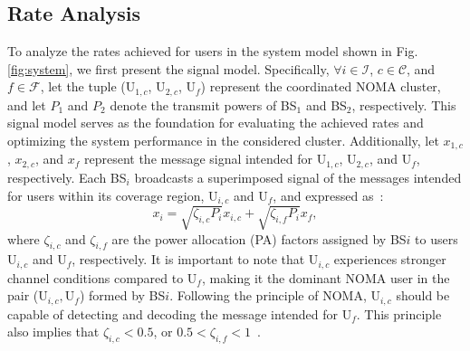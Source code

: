 \documentclass[conference]{IEEEtran}
\begin{document}
\subsection{Rate Analysis}
To analyze the rates achieved for users in the system model shown in Fig. \ref{fig:system}, we first present the signal model. Specifically, $\forall i \in \mathcal{I}$, $c \in \mathcal{C}$, and $f \in \mathcal{F}$, let the tuple (U$_{1,c}$, U$_{2,c}$, U$_f$) represent the coordinated NOMA cluster, and let $P_1$ and $P_2$ denote the transmit powers of BS$_1$ and BS$_2$, respectively. This signal model serves as the foundation for evaluating the achieved rates and optimizing the system performance in the considered cluster. Additionally, let $x_{1,c}$, $x_{2,c}$, and $x_f$ represent the message signal intended for U$_{1,c}$, U$_{2,c}$, and U$_f$, respectively. Each BS$_i$ broadcasts a superimposed signal of the messages intended for users within its coverage region, U$_{i,c}$ and U$_f$, and expressed as~\cite{saito2013non}:
\begin{equation}
    x_{i}=\sqrt{\zeta_{i,c}P_i}x_{i,c} + \sqrt{\zeta_{i,f}P_i}x_f,
\end{equation}
where $\zeta_{i,c}$ and $\zeta_{i,f}$ are the power allocation (PA) factors assigned by BS$i$ to users U$_{i,c}$ and U$_f$, respectively. It is important to note that U$_{i,c}$ experiences stronger channel conditions compared to U$_f$, making it the dominant NOMA user in the pair ($\text{U}_{i,c}, \text{U}_f$) formed by BS$i$. Following the principle of NOMA, U$_{i,c}$ should be capable of detecting and decoding the message intended for U$_f$. This principle also implies that $\zeta_{i,c} < 0.5$, or $0.5 < \zeta_{i,f} < 1$~\cite{obeed2020user, salem2020noma}.
\end{document}
